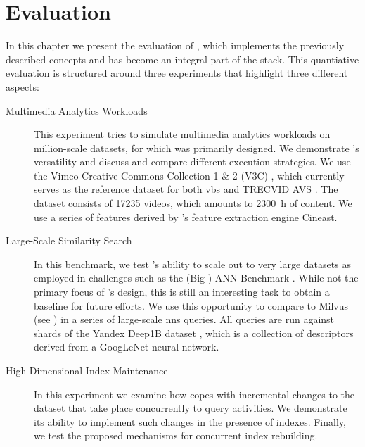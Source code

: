 \chapter{Evaluation}
\label{chapter:evaluation}

In this chapter we present the evaluation of \cottontail{} \cite{Gasser:2020Cottontail}, which implements the previously described concepts and has become an integral part of the \vitrivr{} \cite{Rossetto:2016Vitrivr,Gasser:2019Towards,Gasser:2019Multimodal} stack. This quantiative evaluation is structured around three experiments that highlight three different aspects:

\begin{description}
    \item[Multimedia Analytics Workloads] This experiment tries to simulate multimedia analytics workloads on million-scale datasets, for which \cottontail{} was primarily designed. We demonstrate \cottontail{}'s versatility and discuss and compare different execution strategies. We use the Vimeo Creative Commons Collection 1 \& 2 (V3C) \cite{Berns:2019V3C1,Rossetto:2021Insights}, which currently serves as the reference dataset for both \acrshort{vbs} \cite{Schoeffmann:2019Video} and TRECVID AVS \cite{Chen:2021What}. The dataset consists of  \SI{17235}{} videos, which amounts to \SI{2300}{\hour} of content. We use a series of features derived by \vitrivr{}'s feature extraction engine Cineast.
    \item[Large-Scale Similarity Search] In this benchmark, we test \cottontail{}'s ability to scale out to very large datasets as employed in challenges such as the (Big-) ANN-Benchmark \cite{Aumueller:2017ANN,Simhadri:2022Results}. While not the primary focus of \cottontail{}'s design, this is still an interesting task to obtain a baseline for future efforts. We use this opportunity to compare \cottontail{} to Milvus (see ) in a series of large-scale \acrshort{nns} queries. All queries are run against shards of the Yandex Deep1B dataset \cite{Babenko:2016Efficient}, which is a collection of descriptors derived from a GoogLeNet \cite{Szegedy:2015Going} neural network.
    \item[High-Dimensional Index Maintenance] In this experiment we examine how \cottontail{} copes with incremental changes to the dataset that take place concurrently to query activities. We demonstrate its ability to implement such changes in the presence of indexes. Finally, we test the proposed mechanisms for concurrent index rebuilding.
\end{description}

